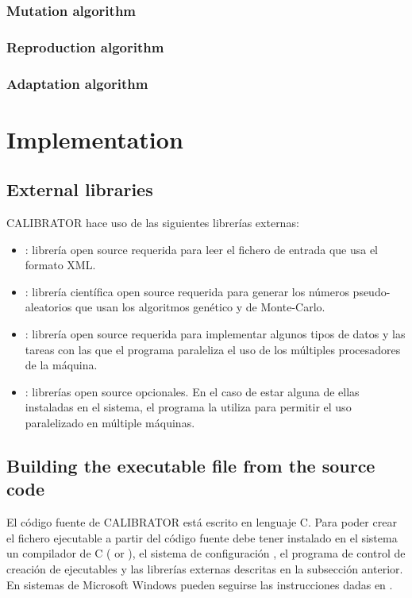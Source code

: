 \documentclass[review,authoryear]{elsarticle}
\begin{document}
\subsubsection{Mutation algorithm}

\subsubsection{Reproduction algorithm}

\subsubsection{Adaptation algorithm}

\section{Implementation}

\subsection{External libraries}

CALIBRATOR hace uso de las siguientes librerías externas:

\begin{itemize}
\item\cite{libxml}: librería open source requerida para leer el fichero
	de entrada que usa el formato XML.
\item\cite{gsl}: librería científica open source requerida para generar
	los números pseudo-aleatorios que usan los algoritmos genético y de
	Monte-Carlo.
\item\cite{glib}: librería open source requerida para implementar algunos
	tipos de datos y las tareas con las que el programa paraleliza el uso de los
	múltiples procesadores de la máquina.
\item\cite{openmpi,mpich}: librerías open source opcionales. En
	el caso de estar alguna de ellas instaladas en el sistema, el programa la
	utiliza para permitir el uso paralelizado en múltiple máquinas.
\end{itemize}

\subsection{Building the executable file from the source code}

El código fuente de CALIBRATOR está escrito en lenguaje C. Para poder crear el
fichero ejecutable a partir del código fuente debe tener instalado en el sistema
un compilador de C (\cite{gcc} or \cite{clang}), el sistema de configuración
\cite{automake}, el programa de control de creación de ejecutables
\cite{gnumake} y las librerías externas descritas en la subsección anterior. En
sistemas de Microsoft Windows pueden seguirse las instrucciones dadas en
\cite{mingw-make}.
\end{document}
